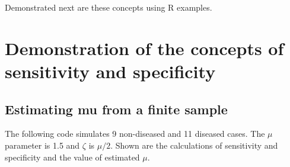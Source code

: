 \documentclass[
]{book}
\newenvironment{Shaded}{\begin{snugshade}}{\end{snugshade}}
\newcommand{\CharTok}[1]{\textcolor[rgb]{0.31,0.60,0.02}{#1}}
\newcommand{\CommentTok}[1]{\textcolor[rgb]{0.56,0.35,0.01}{\textit{#1}}}
\newcommand{\DecValTok}[1]{\textcolor[rgb]{0.00,0.00,0.81}{#1}}
\newcommand{\FloatTok}[1]{\textcolor[rgb]{0.00,0.00,0.81}{#1}}
\newcommand{\KeywordTok}[1]{\textcolor[rgb]{0.13,0.29,0.53}{\textbf{#1}}}
\newcommand{\NormalTok}[1]{#1}
\newcommand{\OperatorTok}[1]{\textcolor[rgb]{0.81,0.36,0.00}{\textbf{#1}}}
\newcommand{\StringTok}[1]{\textcolor[rgb]{0.31,0.60,0.02}{#1}}
\begin{document}
Demonstrated next are these concepts using R examples.

\hypertarget{binary-task-model-sensitivity-specificity-demo}{%
\section{Demonstration of the concepts of sensitivity and specificity}\label{binary-task-model-sensitivity-specificity-demo}}

\hypertarget{estimating-mu-from-a-finite-sample}{%
\subsection{Estimating mu from a finite sample}\label{estimating-mu-from-a-finite-sample}}

The following code simulates 9 non-diseased and 11 diseased cases. The \(\mu\) parameter is 1.5 and \(\zeta\) is \(\mu/2\). Shown are the calculations of sensitivity and specificity and the value of estimated \(\mu\).

\begin{Shaded}
\end{Shaded}
\end{document}
